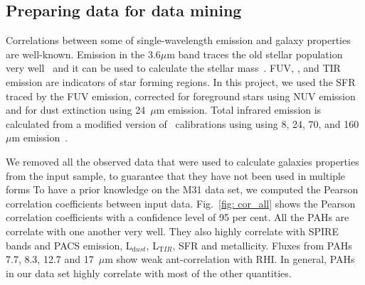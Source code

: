        \subsection{Preparing data for data mining}
    
     Correlations between some of single-wavelength emission and galaxy properties are well-known.
     Emission in the 3.6$\mu$m band traces the old stellar population very well~\citep[e.g.][]{Smith07a,Leitherer99} and it can be used to calculate the stellar mass~\citep{Eskew12}.
     FUV, \halpha, and TIR emission are indicators of star forming regions.
     In this project, we used the SFR traced by the FUV emission, corrected for foreground stars using NUV emission and for dust extinction using 24~$\mu$m emission.
     Total infrared emission is calculated from a modified version of~\cite{Draine07} calibrations using using 8, 24, 70, and 160~$\mu$m emission~\citep{Boquien10}.
    
    We removed all the observed data that were used to calculate galaxies properties from the input sample, to guarantee that they have not been used in multiple forms
    To have a prior knowledge on the M31 data set, %
    we computed the Pearson correlation coefficients between input data.
    Fig.~\ref{fig: cor_all} shows the Pearson correlation coefficients with a confidence level of 95 per cent. 
    All the PAHs are correlate with one another very well.
    They also highly correlate with SPIRE bands and PACS emission, L$_{\mathrm dust}$, L$_{\mathrm TIR}$, SFR and metallicity.
    Fluxes from PAHs 7.7, 8.3, 12.7 and 17~$\mu$m show weak ant-correlation with RHI.
    In general, PAHs in our data set highly correlate with most of the other quantities. 
    
